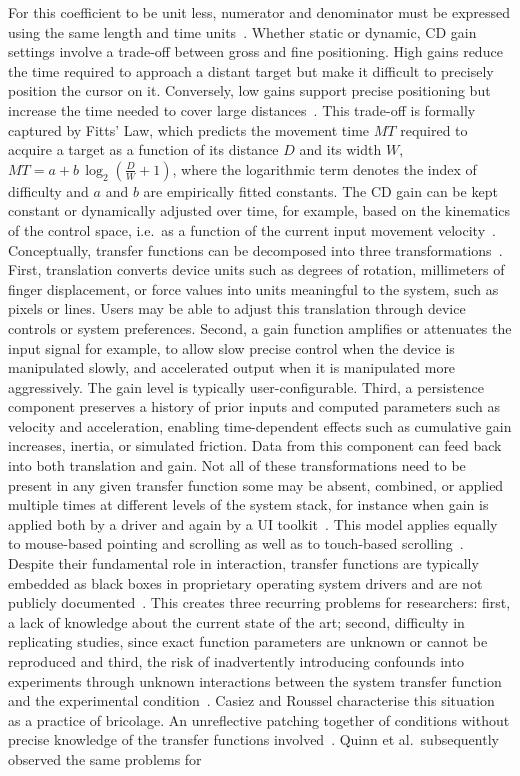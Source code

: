 For this coefficient to be unit less, numerator and denominator must be expressed using the same length and time units~\cite{casiez2011no}. Whether static or dynamic, CD gain settings involve a trade-off between gross and fine positioning. High gains reduce the time required to approach a distant target but make it difficult to precisely position the cursor on it. Conversely, low gains support precise positioning but increase the time needed to cover large distances~\cite{mackenzie1995input}. This trade-off is formally captured by Fitts' Law, which predicts the movement time $MT$ required to acquire a target as a function of its distance $D$ and its width $W$, $MT = a + b\,\log_2\!\left(\tfrac{D}{W} + 1\right)$, where the logarithmic term denotes the index of difficulty and $a$ and $b$ are empirically fitted constants. The CD gain can be kept constant or dynamically adjusted over time, for example, based on the kinematics of the control space, i.e.\ as a function of the current input movement velocity~\cite{casiez2011no}. Conceptually, transfer functions can be decomposed into three transformations~\cite{quinn2012exposing, quinn2013touch}. First, translation converts device units such as degrees of rotation, millimeters of finger displacement, or force values into units meaningful to the system, such as pixels or lines. Users may be able to adjust this translation through device controls or system preferences. Second, a gain function amplifies or attenuates the input signal for example, to allow slow precise control when the device is manipulated slowly, and accelerated output when it is manipulated more aggressively. The gain level is typically user-configurable. Third, a persistence component preserves a history of prior inputs and computed parameters such as velocity and acceleration, enabling time-dependent effects such as cumulative gain increases, inertia, or simulated friction. Data from this component can feed back into both translation and gain. Not all of these transformations need to be present in any given transfer function some may be absent, combined, or applied multiple times at different levels of the system stack, for instance when gain is applied both by a driver and again by a UI toolkit~\cite{quinn2012exposing}. This model applies equally to mouse-based pointing and scrolling as well as to touch-based scrolling~\cite{quinn2012exposing, quinn2013touch}. Despite their fundamental role in interaction, transfer functions are typically embedded as black boxes in proprietary operating system drivers and are not publicly documented~\cite{quinn2012exposing, quinn2013touch}. This creates three recurring problems for researchers: first, a lack of knowledge about the current state of the art; second, difficulty in replicating studies, since exact function parameters are unknown or cannot be reproduced and third, the risk of inadvertently introducing confounds into experiments through unknown interactions between the system transfer function and the experimental condition~\cite{quinn2012exposing}. Casiez and Roussel characterise this situation as a practice of bricolage. An unreflective patching together of conditions without precise knowledge of the transfer functions involved~\cite{casiez2011no}. Quinn et al.\ subsequently observed the same problems for 